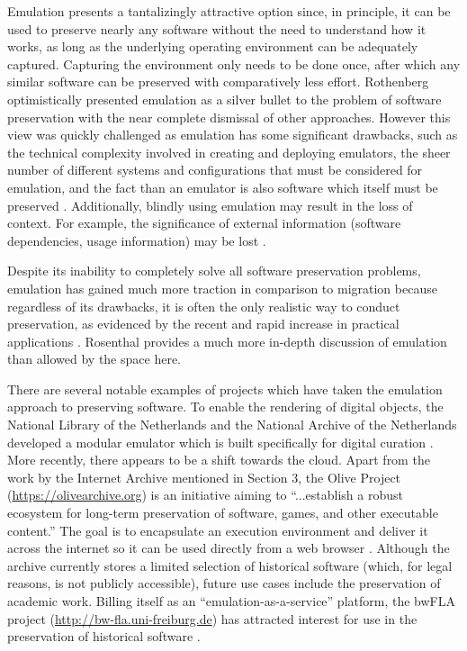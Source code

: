 \documentclass[letterpaper,11pt]{article}
\begin{document}
Emulation presents a tantalizingly attractive option since, in principle, it can be used to preserve nearly any software without the need to understand how it works, as long as the underlying operating environment can be adequately captured. Capturing the environment only needs to be done once, after which any similar software can be preserved with comparatively less effort. Rothenberg \citep{rothenberg1995,rothenberg1999} optimistically presented emulation as a silver bullet to the problem of software preservation with the near complete dismissal of other approaches. However this view was quickly challenged as emulation has some significant drawbacks, such as the technical complexity involved in creating and deploying emulators, the sheer number of different systems and configurations that must be considered for emulation, and the fact than an emulator is also software which itself must be preserved \citep{granger2000,bearman1999}.  Additionally, blindly using emulation may result in the loss of context. For example, the significance of external information (software dependencies, usage information) may be lost \citep{lowood2013}.

Despite its inability to completely solve all software preservation problems, emulation has gained much more traction in comparison to migration because regardless of its drawbacks, it is often the only realistic way to conduct preservation, as evidenced by the recent and rapid increase in practical applications \citep{wheatley2016}. Rosenthal \citep{rosenthal2015} provides a much more in-depth discussion of emulation than allowed by the space here.

There are several notable examples of projects which have taken the emulation approach to preserving software. To enable the rendering of digital objects, the National Library of the Netherlands and the National Archive of the Netherlands developed a modular emulator which is built specifically for digital curation \citep{vanderhoeven2007}. More recently, there appears to be a shift towards the cloud. Apart from the work by the Internet Archive mentioned in Section 3, the Olive Project (\url{https://olivearchive.org}) is an initiative aiming to ``...establish a robust ecosystem for long-term preservation of software, games, and other executable content.'' The goal is to encapsulate an execution environment and deliver it across the internet so it can be used directly from a web browser \citep{satyanarayanan2015}. Although the archive currently stores a limited selection of historical software (which, for legal reasons, is not publicly accessible), future use cases include the preservation of academic work. Billing itself as an ``emulation-as-a-service'' platform, the bwFLA project (\url{http://bw-fla.uni-freiburg.de}) has attracted interest for use in the preservation of historical software \citep{cochrane2014}.
\end{document}
